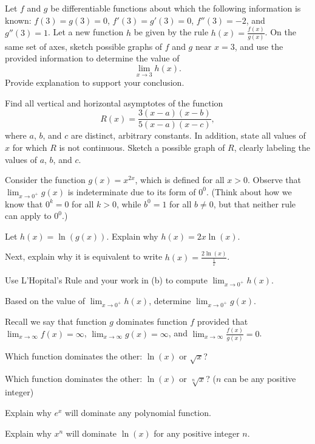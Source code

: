 \begin{exercises} 

\item Let $f$ and $g$ be differentiable functions about which the following information is known:  $f(3) = g(3) = 0$, $f'(3) = g'(3) = 0$, $f''(3) = -2$, and $g''(3) = 1$.  Let a new function $h$ be given by the rule $h(x) = \frac{f(x)}{g(x)}$.  On the same set of axes, sketch possible graphs of $f$ and $g$ near $x = 3$, and use the provided information to determine the value of 
$$\lim_{x \to 3} h(x).$$
Provide explanation to support your conclusion.

\item Find all vertical and horizontal asymptotes of the function 
$$R(x) = \frac{3(x-a)(x-b)}{5(x-a)(x-c)},$$
where $a$, $b$, and $c$ are distinct, arbitrary constants.  In addition, state all values of $x$ for which $R$ is not continuous. Sketch a possible graph of $R$, clearly labeling the values of $a$, $b$, and $c$.

\item Consider the function $g(x) = x^{2x}$, which is defined for all $x > 0$.  Observe that $\lim_{x \to 0^+} g(x)$ is indeterminate due to its form of $0^0$.  (Think about how we know that $0^k = 0$ for all $k > 0$, while $b^0 = 1$ for all $b \ne 0$, but that neither rule can apply to $0^0$.)
	\ba
		\item Let $h(x) = \ln(g(x))$.  Explain why $h(x) = 2x \ln(x).$
		\item Next, explain why it is equivalent to write $h(x) = \frac{2\ln(x)}{\frac{1}{x}}$.
		\item Use L'Hopital's Rule and your work in (b) to compute $\lim_{x \to 0^+} h(x)$.
		\item Based on the value of $\lim_{x \to 0^+} h(x)$, determine $\lim_{x \to 0^+} g(x).$
	\ea

\item Recall we say that function $g$ dominates function $f$ provided that $\lim_{x \to \infty} f(x) = \infty$, $\lim_{x \to \infty} g(x) = \infty$, and $\lim_{x \to \infty} \frac{f(x)}{g(x)} = 0$. 
	\ba
		\item Which function dominates the other: $\ln(x)$ or $\sqrt{x}$?
		\item Which function dominates the other: $\ln(x)$ or $\sqrt[n]{x}$? ($n$ can be any positive integer)
		\item Explain why $e^x$ will dominate any polynomial function.
		\item Explain why $x^n$ will dominate $\ln(x)$ for any positive integer $n$.
	\ea

\end{exercises}
\afterexercises
